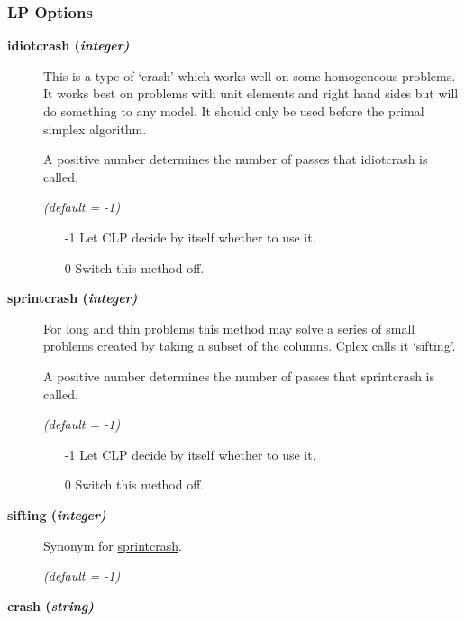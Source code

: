 \subsubsection{LP Options}

\begin{description}

\item[\label{idiotcrash}\hypertarget{idiotcrash}
{\textbf{idiotcrash (\slshape{integer})}}]\hspace{1.0in}

This is a type of `crash' which works well on some homogeneous problems.
It works best on problems with unit elements and right hand sides but will do something to any model.
It should only be used before the primal simplex algorithm.

A positive number determines the number of passes that idiotcrash is called.

\textsl{(default = -1)}
\begin{itemize}
\item[-1] 
Let CLP decide by itself whether to use it.
\item[0] 
Switch this method off.
\end{itemize}

\item[\label{sprintcrash}\hypertarget{sprintcrash}
{\textbf{sprintcrash (\slshape{integer})}}]\hspace{1.0in}

For long and thin problems this method may solve a series of small problems created by taking a subset of the columns.
Cplex calls it `sifting'.

A positive number determines the number of passes that sprintcrash is called.

\textsl{(default = -1)}
\begin{itemize}
\item[-1] 
Let CLP decide by itself whether to use it.
\item[0] 
Switch this method off.
\end{itemize}

\item[\label{sifting}\hypertarget{sifting}
{\textbf{sifting (\slshape{integer})}}]\hspace{1.0in}

Synonym for \hyperlink{sprintcrash}{sprintcrash}.

\textsl{(default = -1)}

\item[\label{crash}\hypertarget{crash}
{\textbf{crash (\slshape{string})}}]\hspace{1.0in}


\end{description}
